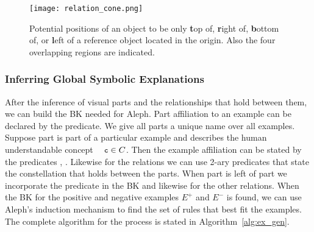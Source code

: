 \begin{figure}[t]
  \centering
  \texttt{[image: relation\_cone.png]}
  \caption{Potential positions of an object to be only \textbf{t}op
    of, \textbf{r}ight of, \textbf{b}ottom of, or \textbf{l}eft of a
    reference object located in the origin. Also the four
    overlapping regions are indicated.}
  \label{fig:relations}
\end{figure}


\subsubsection{Inferring Global Symbolic Explanations}

After the inference of visual parts and the relationships that hold
between them, we can build the BK needed for Aleph. Part affiliation
to an example can be declared by the  predicate. We
give all parts a unique name over all examples. Suppose part
 is part of a particular example  and describes
the human understandable concept $\text{\ilprule{c}} \in C$. Then the
example affiliation can be stated by the predicates
, .
Likewise for the relations we can use 2-ary predicates that state the
constellation that holds between the parts. When part  is
left of part  we incorporate the predicate
 in the BK and likewise for the other
relations. When the BK for the positive and negative examples $E^+$
and $E^-$ is found, we can use Aleph's induction mechanism to find the
set of rules that best fit the examples. The complete algorithm for
the process is stated in Algorithm~\ref{alg:ex_gen}.

\begin{comment}
  Since we want to allow a certain degree of tolerance, we set the
  \emph{noise} hyperparameter $n$ of Aleph to a value above
  zero. This value gives the percentage of the maximally allowed
  false positives for an induced theory given the examples. That
  means, that a higher value allows for more negative examples to be
  covered by the rules, thus resulting in more general rules.
\end{comment}

